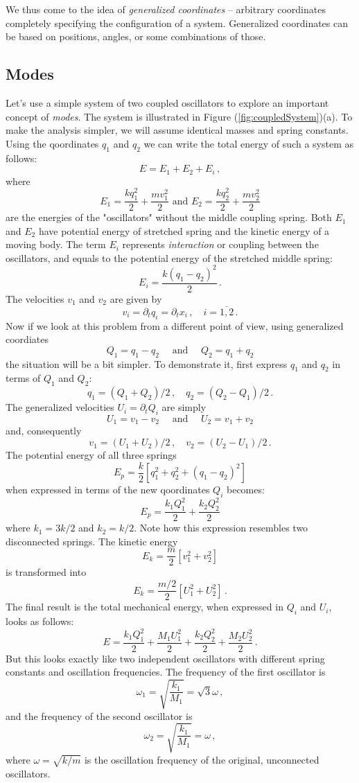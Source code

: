 We thus come to the idea of \emph{generalized coordinates} --
arbitrary coordinates completely specifying the configuration of a
system. Generalized coordinates can be based on positions, angles, or
some combinations of those.

\subsection{Modes}
Let's use a simple system of two coupled oscillators to explore an important concept of \emph{modes}. The system is illustrated in Figure (\ref{fig:coupledSystem})(a). To make the analysis simpler, we will assume identical masses and spring constants. Using the qoordinates $q_1$ and $q_2$ we can write the total energy of such a system as follows:
\[
E = E_1 + E_2 + E_i\,,
\]
where 
\[
E_1 = \frac{k q_1^2}{2}+\frac{m v_1^2}{2}\textrm{ and } E_2 = \frac{k q_2^2}{2}+\frac{m v_2^2}{2}
\]
are the energies of the "oscillators" without the middle coupling spring. Both $E_1$ and $E_2$ have potential energy of stretched spring and the kinetic energy of a moving body. The term $E_i$ represents \emph{interaction} or coupling between the oscillators, and equals to the potential energy of the stretched middle spring:
\[
E_i = \frac{k(q_1-q_2)^2}{2}\,.
\]
The velocities $v_1$ and $v_2$ are given by
\[
v_i = \partial_t q_i = \partial_t x_i\,,\quad i=\overline{1,2}\,.
\]
Now if we look at this problem from a different point of view, using generalized coordiates 
\[
Q_1 = q_1-q_2\quad\textrm{ and }\quad Q_2 = q_1 + q_2
\]
the situation will be a bit simpler. To demonstrate it, first express $q_1$ and $q_2$ in terms of $Q_1$ and $Q_2$:
\[
q_1 = (Q_1+Q_2)/2\,,\quad q_2 = (Q_2-Q_1)/2\,.
\]
The generalized velocities $U_i=\partial_t Q_i$ are simply
\[
U_1 = v_1-v_2\quad\textrm{ and }\quad U_2 = v_1 + v_2
\]
and, consequently
\[
v_1 = (U_1+U_2)/2\,,\quad v_2 = (U_2-U_1)/2\,.
\]
The potential energy of all three springs
\[
E_p = \frac{k}{2}\left\lbrack q_1^2 + q_2^2 + (q_1-q_2)^2\right\rbrack
\]
when expressed in terms of the new qoordinates $Q_i$ becomes:
\[
E_p = \frac{k_1 Q_1^2}{2} + \frac{k_2 Q_2^2}{2}
\]
where $k_1 = 3k/2$ and $k_2=k/2$. Note how this expression resembles two disconnected springs. The kinetic energy
\[
E_k = \frac{m}{2}\left\lbrack v_1^2 + v_2^2 \right\rbrack
\]
is transformed into 
\[
E_k = \frac{m/2}{2}\left\lbrack U_1^2 + U_2^2 \right\rbrack\,.
\]
The final result is the total mechanical energy, when expressed in $Q_i$ and $U_i$, looks as follows:
\[
E = \frac{k_1 Q_1^2}{2}+\frac{M_1 U_1^2}{2} + \frac{k_2 Q_2^2}{2}+\frac{M_2 U_2^2}{2}\,.
\]
But this looks exactly like two independent oscillators with different spring constants and oscillation frequencies. The frequency of the first oscillator is 
\[
\omega_1 = \sqrt{\frac{k_1}{M_1}} = \sqrt{3}\omega\,,
\]
and the frequency of the second oscillator is
\[
\omega_2 = \sqrt{\frac{k_1}{M_1}} = \omega\,,
\]
where $\omega = \sqrt{k/m}$ is the oscillation frequency of the original, unconnected oscillators.


